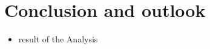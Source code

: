 \chapter{Conclusion and outlook} \label{conclusion}

\begin{itemize}
\item result of the Analysis
\end{itemize}